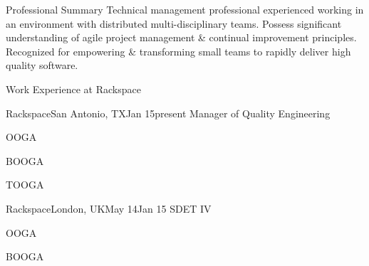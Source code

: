 \documentclass{resume} %
\begin{document}
\vspace{1em}

\begin{rSection}{Professional Summary}
Technical management professional experienced working in an
environment with distributed multi-disciplinary teams. Possess significant
understanding of agile project management \& continual improvement principles. Recognized for
empowering \& transforming small teams to rapidly deliver high
quality software.
\end{rSection}


\begin{rSection}{Work Experience at Rackspace}
\begin{rSubsection}{Rackspace}{San Antonio, TX}{Jan
    15}{present}
{Manager of Quality Engineering}

\item OOGA
\item BOOGA
\item TOOGA
\end{rSubsection}


\begin{rSubsection}{Rackspace}{London, UK}{May 14}{Jan 15}
{SDET IV}

\item OOGA
\item BOOGA
\end{rSubsection}
\end{rSection}

\end{document}
